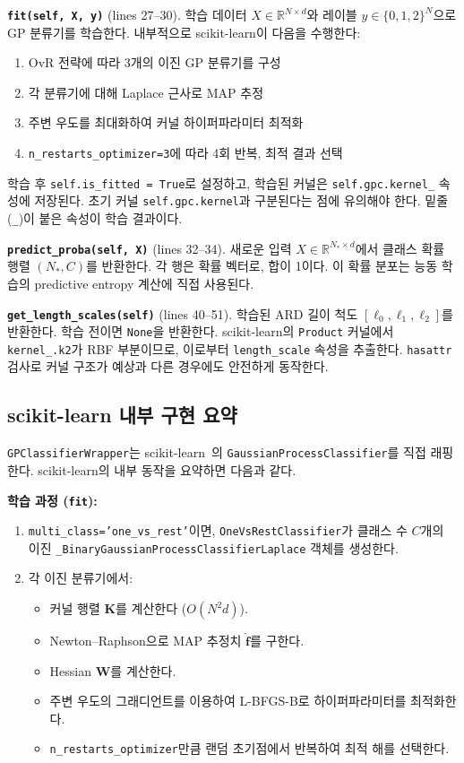 \documentclass[11pt]{article}
\begin{document}
\textbf{\texttt{fit(self, X, y)}} (lines 27--30).
학습 데이터 $X \in \mathbb{R}^{N \times d}$와 레이블 $y \in \{0, 1, 2\}^N$으로 GP 분류기를 학습한다.
내부적으로 scikit-learn이 다음을 수행한다:
\begin{enumerate}[nosep]
  \item OvR 전략에 따라 3개의 이진 GP 분류기를 구성
  \item 각 분류기에 대해 Laplace 근사로 MAP 추정
  \item 주변 우도를 최대화하여 커널 하이퍼파라미터 최적화
  \item \texttt{n\_restarts\_optimizer=3}에 따라 4회 반복, 최적 결과 선택
\end{enumerate}

학습 후 \texttt{self.is\_fitted = True}로 설정하고, 학습된 커널은 \texttt{self.gpc.kernel\_} 속성에 저장된다.
초기 커널 \texttt{self.gpc.kernel}과 구분된다는 점에 유의해야 한다.
밑줄(\texttt{\_})이 붙은 속성이 학습 결과이다.

\textbf{\texttt{predict\_proba(self, X)}} (lines 32--34).
새로운 입력 $X \in \mathbb{R}^{N_* \times d}$에서 클래스 확률 행렬 $(N_*, C)$를 반환한다.
각 행은 확률 벡터로, 합이 1이다.
이 확률 분포는 능동 학습의 predictive entropy 계산에 직접 사용된다.

\textbf{\texttt{get\_length\_scales(self)}} (lines 40--51).
학습된 ARD 길이 척도 $[\ell_0, \ell_1, \ell_2]$를 반환한다. 학습 전이면 \texttt{None}을 반환한다.
scikit-learn의 \texttt{Product} 커널에서 \texttt{kernel\_.k2}가 RBF 부분이므로,
이로부터 \texttt{length\_scale} 속성을 추출한다.
\texttt{hasattr} 검사로 커널 구조가 예상과 다른 경우에도 안전하게 동작한다.


\subsection{scikit-learn 내부 구현 요약}

\texttt{GPClassifierWrapper}는 scikit-learn~\cite{Pedregosa2011}의 \texttt{GaussianProcessClassifier}를 직접 래핑한다.
scikit-learn의 내부 동작을 요약하면 다음과 같다.

\textbf{학습 과정 (\texttt{fit}):}
\begin{enumerate}[nosep]
  \item \texttt{multi\_class='one\_vs\_rest'}이면, \texttt{OneVsRestClassifier}가 클래스 수 $C$개의 이진 \texttt{\_BinaryGaussianProcessClassifierLaplace} 객체를 생성한다.
  \item 각 이진 분류기에서:
  \begin{itemize}[nosep]
    \item 커널 행렬 $\mathbf{K}$를 계산한다 ($O(N^2 d)$).
    \item Newton--Raphson으로 MAP 추정치 $\hat{\mathbf{f}}$를 구한다.
    \item Hessian $\mathbf{W}$를 계산한다.
    \item 주변 우도의 그래디언트를 이용하여 L-BFGS-B로 하이퍼파라미터를 최적화한다.
    \item \texttt{n\_restarts\_optimizer}만큼 랜덤 초기점에서 반복하여 최적 해를 선택한다.
  \end{itemize}
\end{enumerate}
\end{document}
